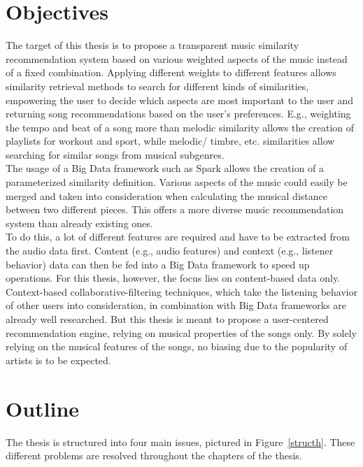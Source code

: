 \section{Objectives}

The target of this thesis is to propose a transparent music similarity recommendation system based on various weighted aspects of the music instead of a fixed combination. Applying different weights to different features allows similarity retrieval methods to search for different kinds of similarities, empowering the user to decide which aspects are most important to the user and returning song recommendations based on the user's preferences. E.g., weighting the tempo and beat of a song more than melodic similarity allows the creation of playlists for workout and sport, while melodic/ timbre, etc. similarities allow searching for similar songs from musical subgenres.\\ 
The usage of a Big Data framework such as Spark allows the creation of a parameterized similarity definition. Various aspects of the music could easily be merged and taken into consideration when calculating the musical distance between two different pieces. This offers a more diverse music recommendation system than already existing ones.\\ 
To do this, a lot of different features are required and have to be extracted from the audio data first. Content (e.g., audio features) and context (e.g., listener behavior) data can then be fed into a Big Data framework to speed up operations. For this thesis, however, the focus lies on content-based data only.\\ 
Context-based collaborative-filtering techniques, which take the listening behavior of other users into consideration, in combination with Big Data frameworks are already well researched. But this thesis is meant to propose a user-centered recommendation engine, relying on musical properties of the songs only. By solely relying on the musical features of the songs, no biasing due to the popularity of artists is to be expected.\\

\section{Outline}

\noindent The thesis is structured into four main issues, pictured in Figure~\ref{structh}. These different problems are resolved throughout the chapters of the thesis.

